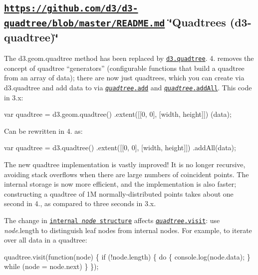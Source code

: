 \subsection*{\href{https://github.com/d3/d3-quadtree/blob/master/README.md}{\tt https\+://github.\+com/d3/d3-\/quadtree/blob/master/\+R\+E\+A\+D\+M\+E.\+md} \char`\"{}\+Quadtrees (d3-\/quadtree)\char`\"{}}

The d3.\+geom.\+quadtree method has been replaced by \href{https://github.com/d3/d3-quadtree/blob/master/README.md#quadtree}{\tt d3.\+quadtree}. 4. removes the concept of quadtree “generators” (configurable functions that build a quadtree from an array of data); there are now just quadtrees, which you can create via d3.\+quadtree and add data to via \href{https://github.com/d3/d3-quadtree/blob/master/README.md#quadtree_add}{\tt {\itshape quadtree}.add} and \href{https://github.com/d3/d3-quadtree/blob/master/README.md#quadtree_addAll}{\tt {\itshape quadtree}.add\+All}. This code in 3.\+x\+:


\begin{DoxyCode}
var quadtree = d3.geom.quadtree()
    .extent([[0, 0], [width, height]])
    (data);
\end{DoxyCode}


Can be rewritten in 4. as\+:


\begin{DoxyCode}
var quadtree = d3.quadtree()
    .extent([[0, 0], [width, height]])
    .addAll(data);
\end{DoxyCode}


The new quadtree implementation is vastly improved! It is no longer recursive, avoiding stack overflows when there are large numbers of coincident points. The internal storage is now more efficient, and the implementation is also faster; constructing a quadtree of 1M normally-\/distributed points takes about one second in 4., as compared to three seconds in 3.\+x.

The change in \href{https://github.com/d3/d3-quadtree/blob/master/README.md#nodes}{\tt internal {\itshape node} structure} affects \href{https://github.com/d3/d3-quadtree/blob/master/README.md#quadtree_visit}{\tt {\itshape quadtree}.visit}\+: use {\itshape node}.length to distinguish leaf nodes from internal nodes. For example, to iterate over all data in a quadtree\+:


\begin{DoxyCode}
quadtree.visit(function(node) \{
  if (!node.length) \{
    do \{
      console.log(node.data);
    \} while (node = node.next)
  \}
\});
\end{DoxyCode}


